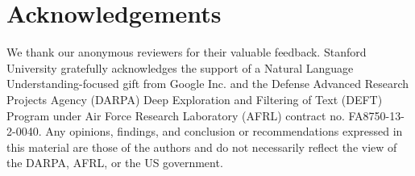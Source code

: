 \documentclass[11pt]{article}
\begin{document}
\section*{Acknowledgements}

We thank our anonymous reviewers for their valuable feedback. 
Stanford University gratefully acknowledges the support of a Natural Language
Understanding-focused gift from Google Inc. and the Defense
Advanced Research Projects Agency (DARPA) Deep Exploration and Filtering
of Text (DEFT) Program under Air Force Research Laboratory (AFRL)
contract no. FA8750-13-2-0040. Any opinions, findings, and conclusion or
recommendations expressed in this material are those of the authors and
do not necessarily reflect the view of the DARPA, AFRL, or the US
government.



\end{document}
